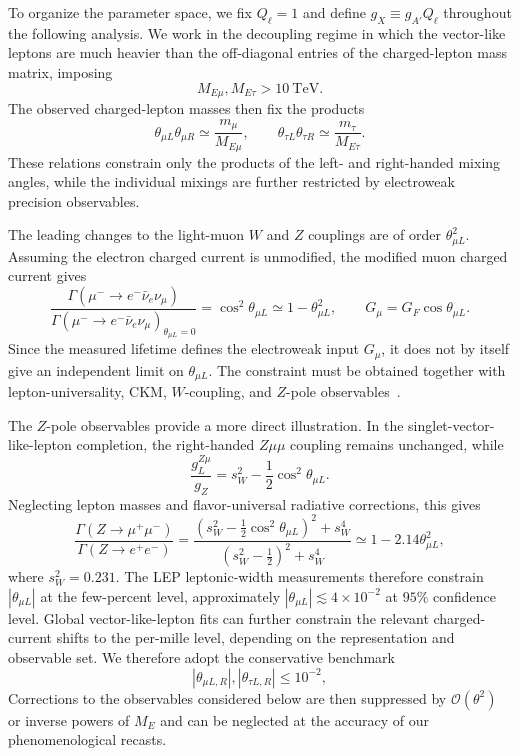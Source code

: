 \documentclass[onecolumn, aps, nofootinbib, prd, preprint, floats, floatfix, amsmath, amssymb, superscriptaddress, preprintnumbers]{revtex4-2}
\begin{document}
To organize the parameter space, we fix $Q_\ell=1$ and define $g_X\equiv g_{A'}Q_\ell$ throughout the following analysis. We work in the decoupling regime in which the vector-like leptons are much heavier than the off-diagonal entries of the charged-lepton mass matrix, imposing
\begin{equation}
M_{E\mu},M_{E\tau}>10~\mathrm{TeV}.
\end{equation}
The observed charged-lepton masses then fix the products
\begin{equation}
\theta_{\mu L}\theta_{\mu R}\simeq\frac{m_\mu}{M_{E\mu}},
\qquad
\theta_{\tau L}\theta_{\tau R}\simeq\frac{m_\tau}{M_{E\tau}}.
\end{equation}
These relations constrain only the products of the left- and right-handed mixing angles, while the individual mixings are further restricted by electroweak precision observables.

The leading changes to the light-muon $W$ and $Z$ couplings are of order $\theta_{\mu L}^2$. Assuming the electron charged current is unmodified, the modified muon charged current gives
\begin{equation}
\frac{\Gamma(\mu^-\to e^-\bar\nu_e\nu_\mu)}
{\Gamma(\mu^-\to e^-\bar\nu_e\nu_\mu)_{\theta_{\mu L}=0}}
=\cos^2\theta_{\mu L}
\simeq1-\theta_{\mu L}^2,
\qquad G_\mu=G_F\cos\theta_{\mu L}.
\label{eq:muon-lifetime-mixing}
\end{equation}
Since the measured lifetime defines the electroweak input $G_\mu$, it does not by itself give an independent limit on $\theta_{\mu L}$. The constraint must be obtained together with lepton-universality, CKM, $W$-coupling, and $Z$-pole observables~\cite{ParticleDataGroup:2024cfk,ALEPH:2005ab,Crivellin:2020ebi,Poh:2017tfo}. 

The $Z$-pole observables provide a more direct illustration. In the singlet-vector-like-lepton completion, the right-handed $Z\mu\mu$ coupling remains unchanged, while
\begin{equation}
\frac{g_L^{Z\mu}}{g_Z}
=s_W^2-\frac{1}{2}\cos^2\theta_{\mu L}.
\end{equation}
Neglecting lepton masses and flavor-universal radiative corrections, this gives
\begin{equation}
\frac{\Gamma(Z\to\mu^+\mu^-)}
{\Gamma(Z\to e^+e^-)}
=
\frac{\left(s_W^2-\frac12\cos^2\theta_{\mu L}\right)^2+s_W^4}
{\left(s_W^2-\frac12\right)^2+s_W^4}
\simeq1-2.14\theta_{\mu L}^2,
\end{equation}
where $s_W^2=0.231$. The LEP leptonic-width measurements therefore constrain $|\theta_{\mu L}|$ at the few-percent level, approximately
$|\theta_{\mu L}|\lesssim4\times10^{-2}$ at $95\%$ confidence level. Global vector-like-lepton fits can further constrain the relevant charged-current shifts to the per-mille level, depending on the representation and observable set. We therefore adopt the conservative benchmark
\begin{equation}
|\theta_{\mu L,R}|,|\theta_{\tau L,R}|\leq10^{-2},
\label{eq:mixing-benchmark}
\end{equation}
Corrections to the observables considered below are then suppressed by $\mathcal{O}(\theta^2)$ or inverse powers of $M_E$ and can be neglected at the accuracy of our phenomenological recasts.
\end{document}
